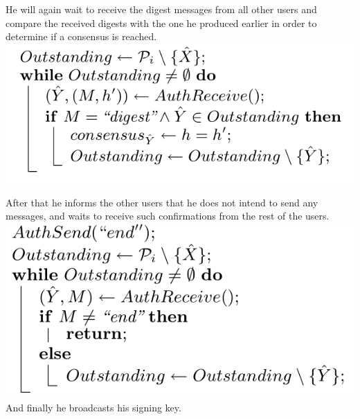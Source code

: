 \documentclass{beamer}
\begin{document}
\begin{frame}
He will again wait to receive the digest messages from all other users and compare the received digests with the one he produced earlier in order to determine if a consensus is reached.\\[0.5cm]

\includegraphics[scale=0.4]{determine_consensus.png}
\end{frame}

\begin{frame}
After that he informs the other users that he does not intend to send any messages, and waits to receive such confirmations from the rest of the users.\\[0.5cm]

\includegraphics[scale=0.4]{no_listen_verify.png}\\[1cm]

And finally he broadcasts his signing key.
\end{frame}
\end{document}

